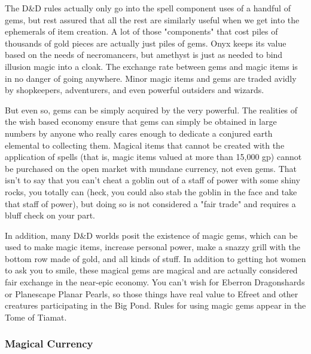 The D\&D rules actually only go into the spell component uses of a handful of gems, but rest assured that all the rest are similarly useful when we get into the ephemerals of item creation. A lot of those "components" that cost piles of thousands of gold pieces are actually just piles of gems. Onyx keeps its value based on the needs of necromancers, but amethyst is just as needed to bind illusion magic into a cloak. The exchange rate between gems and magic items is in no danger of going anywhere. Minor magic items and gems are traded avidly by shopkeepers, adventurers, and even powerful outsiders and wizards.

But even so, gems can be simply acquired by the very powerful. The realities of the wish based economy ensure that gems can simply be obtained in large numbers by anyone who really cares enough to dedicate a conjured earth elemental to collecting them. Magical items that cannot be created with the application of spells (that is, magic items valued at more than 15,000 gp) cannot be purchased on the open market with mundane currency, not even gems. That isn't to say that you can't cheat a goblin out of a staff of power with some shiny rocks, you totally can (heck, you could also stab the goblin in the face and take that staff of power), but doing so is not considered a "fair trade" and requires a bluff check on your part.

In addition, many D\&D worlds posit the existence of magic gems, which can be used to make magic items, increase personal power, make a snazzy grill with the bottom row made of gold, and all kinds of stuff. In addition to getting hot women to ask you to smile, these magical gems are magical and are actually considered fair exchange in the near-epic economy. You can't wish for Eberron Dragonshards or Planescape Planar Pearls, so those things have real value to Efreet and other creatures participating in the Big Pond. Rules for using magic gems appear in the Tome of Tiamat.

\subsubsection{Magical Currency}

